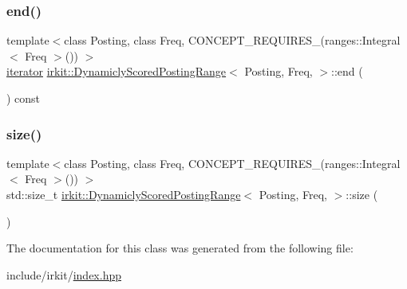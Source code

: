 \subsubsection{\texorpdfstring{end()}{end()}}
{\footnotesize\ttfamily template$<$class Posting, class Freq, C\+O\+N\+C\+E\+P\+T\+\_\+\+R\+E\+Q\+U\+I\+R\+E\+S\+\_\+(ranges\+::\+Integral$<$ Freq $>$()) $>$ \\
\hyperlink{classirkit_1_1DynamiclyScoredPostingRange_1_1iterator}{iterator} \hyperlink{classirkit_1_1DynamiclyScoredPostingRange}{irkit\+::\+Dynamicly\+Scored\+Posting\+Range}$<$ Posting, Freq, $>$\+::end (\begin{DoxyParamCaption}{ }\end{DoxyParamCaption}) const\hspace{0.3cm}{\ttfamily [inline]}}

\mbox{\label{classirkit_1_1DynamiclyScoredPostingRange_aabc7d6435dc95dedef86ee75530d189d}} 
\subsubsection{\texorpdfstring{size()}{size()}}
{\footnotesize\ttfamily template$<$class Posting, class Freq, C\+O\+N\+C\+E\+P\+T\+\_\+\+R\+E\+Q\+U\+I\+R\+E\+S\+\_\+(ranges\+::\+Integral$<$ Freq $>$()) $>$ \\
std\+::size\+\_\+t \hyperlink{classirkit_1_1DynamiclyScoredPostingRange}{irkit\+::\+Dynamicly\+Scored\+Posting\+Range}$<$ Posting, Freq, $>$\+::size (\begin{DoxyParamCaption}{ }\end{DoxyParamCaption})\hspace{0.3cm}{\ttfamily [inline]}}



The documentation for this class was generated from the following file\+:\begin{DoxyCompactItemize}
\item 
include/irkit/\hyperlink{irkit_2index_8hpp}{index.\+hpp}\end{DoxyCompactItemize}
